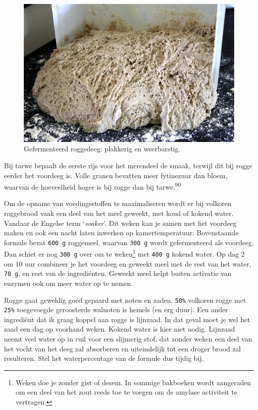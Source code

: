 \documentclass[
  11pt,
  dutch,
]{memoir}
\begin{document}
\begin{figure}
    \centering
    \includegraphics{img/bw/roggedeeg.jpg}
    \caption[Gefermenteerd roggedeeg.]{Gefermenteerd roggedeeg: plakkerig en weerbarstig.}
\end{figure}

Bij tarwe bepaalt de eerste rijs voor het merendeel de smaak, terwijl
dit bij rogge eerder het voordeeg is. Volle granen bevatten meer
fytinezuur dan bloem, waarvan de hoeveelheid hoger is bij rogge dan bij
tarwe.\textsuperscript{90}

Om de opname van voedingsstoffen te maximaliseren wordt er bij volkoren
roggebrood vaak een deel van het meel geweekt, met koud of kokend water.
Vandaar de Engelse term `\emph{soaker}'. Dit weken kan je samen met het
voordeeg maken en ook een nacht laten inwerken op kamertemperatuur.
Bovenstaande formule bevat \texttt{600\ g} roggemeel, waarvan
\texttt{300\ g} wordt gefermenteerd als voordeeg. Dan schiet er nog
\texttt{300\ g} over om te weken\footnote{Weken doe je zonder gist of
  desem. In sommige bakboeken wordt aangeraden om een deel van het zout
  reeds toe te voegen om de amylase activiteit te vertragen.} met
\texttt{400\ g} kokend water. Op dag 2 om 10 uur combineer je het
voordeeg en geweekt meel met de rest van het water, \texttt{70\ g}, en
rest van de ingrediënten. Geweekt meel helpt buiten activatie van
enzymen ook om meer water op te nemen.

Rogge gaat geweldig goed gepaard met noten en zaden. \texttt{50\%}
volkoren rogge met \texttt{25\%} toegevoegde geroosterde walnoten is
hemels (en erg duur). Een ander ingrediënt dat ik graag koppel aan rogge
is lijnzaad. In dat geval moet je wel het zaad een dag op voorhand
weken. Kokend water is hier niet nodig. Lijnzaad neemt veel water op in
ruil voor een slijmerig stof, dat zonder weken een deel van het vocht
van het deeg zal absorberen en uiteindelijk tot een droger brood zal
resulteren. Stel het waterpercentage van de formule dus tijdig bij.
\end{document}

